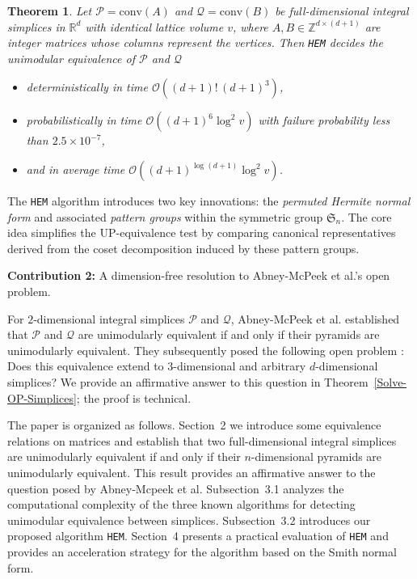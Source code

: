 \documentclass[reqno, 12pt]{article}
\newtheorem{thm}{Theorem}[section]
\theoremstyle{mydefinition}
\theoremstyle{myremark}
\numberwithin{algorithm}{section}
\begin{document}
\begin{thm}\label{thm-core-contri}
Let $\mathcal{P} = \mathrm{conv}(A)$ and $\mathcal{Q} = \mathrm{conv}(B)$ be full-dimensional integral simplices in $\mathbb{R}^d$ with identical lattice volume $v$, where $A, B \in \mathbb{Z}^{d \times (d+1)}$ are integer matrices whose columns represent the vertices. Then \texttt{HEM} decides the unimodular equivalence of $\mathcal{P}$ and $\mathcal{Q}$
\begin{itemize}
    \item deterministically in time $\mathcal{O}((d+1)!\,(d+1)^{3})$,
    \item probabilistically in time $\mathcal{O}((d+1)^{6}\log^{2}v)$ with failure probability less than $2.5\times 10^{-7}$,
    \item and in \emph{average} time $\mathcal{O}((d+1)^{\log (d+1)}\log^{2}v)$.
\end{itemize}
\end{thm}

\noindent
The \texttt{HEM} algorithm introduces two key innovations: the \emph{permuted Hermite normal form} and associated \emph{pattern groups} within the symmetric group $\mathfrak{S}_n$. The core idea simplifies the UP-equivalence test by comparing canonical representatives derived from the coset decomposition induced by these pattern groups.

\medskip

\textbf{Contribution 2:} A dimension-free resolution to Abney-McPeek et al.'s open problem.

For $2$-dimensional integral simplices $\mathcal{P}$ and $\mathcal{Q}$, Abney-McPeek et al. established that $\mathcal{P}$ and $\mathcal{Q}$ are unimodularly equivalent if and only if their pyramids are unimodularly equivalent. They subsequently posed the following open problem \cite[Section~5]{Abney-Mcpeek}: Does this equivalence extend to $3$-dimensional and arbitrary $d$-dimensional simplices?
We provide an affirmative answer to this question in Theorem~\ref{Solve-OP-Simplices}; the proof is technical.


The paper is organized as follows. Section~2  we introduce some equivalence relations on matrices  and establish that two full-dimensional integral simplices are unimodularly equivalent if and only if their $n$-dimensional pyramids are unimodularly equivalent. This result provides an affirmative answer to the question posed by Abney-Mcpeek et al. Subsection~3.1 analyzes the computational complexity of the three known algorithms for detecting unimodular equivalence between simplices. Subsection~3.2 introduces our proposed algorithm \texttt{HEM}.
Section~4 presents a practical evaluation of \texttt{HEM} and provides an acceleration strategy for the algorithm based on the Smith normal form.
\end{document}
